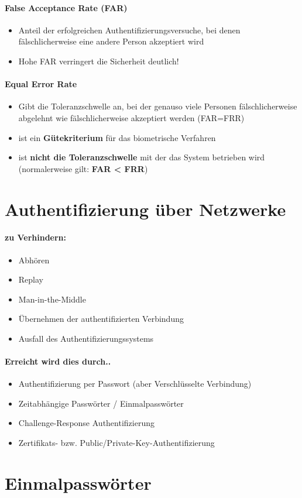\paragraph{False Acceptance Rate (FAR)}
\begin{itemize}
	\item Anteil der erfolgreichen
Authentifizierungsversuche, bei denen
fälschlicherweise eine andere Person
akzeptiert wird
	\item Hohe FAR verringert die Sicherheit deutlich!
\end{itemize}

\paragraph{Equal Error Rate}
\begin{itemize}
	\item Gibt die Toleranzschwelle an, bei der genauso viele Personen fälschlicherweise abgelehnt wie
fälschlicherweise akzeptiert werden (FAR=FRR)
	\item ist ein \textbf{Gütekriterium} für das biometrische Verfahren
	\item ist \textbf{nicht die Toleranzschwelle} mit der das System betrieben wird (normalerweise gilt: \textbf{FAR < FRR})
\end{itemize}

\section{Authentifizierung über Netzwerke}
\paragraph{zu Verhindern:}
\begin{itemize}
	\item Abhören
	\item Replay
	\item Man-in-the-Middle
	\item Übernehmen der authentifizierten Verbindung
	\item Ausfall des Authentifizierungssystems
\end{itemize}

\paragraph{Erreicht wird dies durch..}
\begin{itemize}
	\item Authentifizierung per Passwort (aber Verschlüsselte Verbindung)
	\item Zeitabhängige Passwörter / Einmalpasswörter
	\item Challenge-Response Authentifizierung
	\item Zertifikats- bzw. Public/Private-Key-Authentifizierung
\end{itemize}

\section{Einmalpasswörter}















